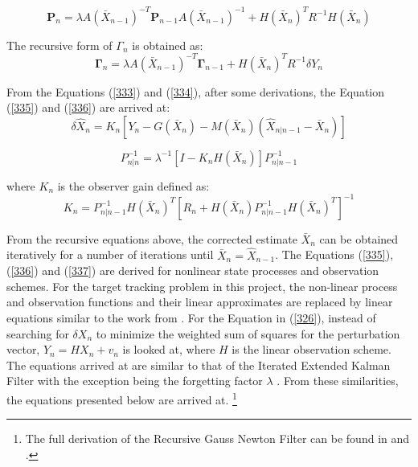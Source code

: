 \begin{equation}
    \mathbf{P}_n = \lambda A(\bar{X}_{n-1})^{-T}\mathbf{P}_{n-1}A(\bar{X}_{n-1})^{-1} + H(\bar{X}_n)^T R^{-1}H(\bar{X}_n)
    \label{333}
\end{equation}

The recursive form of \(\Gamma_n\) is obtained as: 
\begin{equation}
    \mathbf{\Gamma}_n = \lambda A(\bar{X}_{n-1})^{-T}\mathbf{\Gamma}_{n-1} + H(\bar{X}_n)^T R^{-1}\delta Y_n
    \label{334}
\end{equation}

From the Equations (\ref{333}) and (\ref{334}), after some derivations, the Equation (\ref{335}) and (\ref{336}) are arrived at:
\begin{equation}
    \delta \hat{X}_n = K_n[Y_n - G(\bar{X}_n) - M(\bar{X}_n)(\hat{X}_{n|n-1} - \bar{X}_n)]
    \label{335}
\end{equation}
 
\begin{equation}
    P^{-1}_{n|n} = \lambda^{-1}[I - K_n H(\bar{X}_n)]P^{-1}_{n|n-1}
    \label{336}
\end{equation}

where \(K_n\) is the observer gain defined as:
\begin{equation}
    K_n = P^{-1}_{n|n-1} H(\bar{X}_n)^T [R_n + H(\bar{X}_n) P^{-1}_{n|n-1} H(\bar{X}_n)^T]^{-1}
    \label{337}
\end{equation}

From the recursive equations above, the corrected estimate \(\bar{X}_n\) can be obtained iteratively for a number of iterations until \(\bar{X}_n = \hat{X}_{n-1}\). The Equations (\ref{335}), (\ref{336}) and (\ref{337}) are derived for nonlinear state processes and observation schemes. 
\newline
\newline
For the target tracking problem in this project, the non-linear process and observation functions and their linear approximates are replaced by linear equations similar to the work from \cite{Boyer2012}. For the Equation in (\ref{326}), instead of searching for \(\delta X_n\) to minimize the weighted sum of squares for the perturbation vector, \(Y_n = H X_n + v_n\) is looked at, where \(H\) is the linear observation scheme. The equations arrived at are similar to that of the Iterated Extended Kalman Filter with the exception being the forgetting factor \(\lambda\) \cite{De2015}. From these similarities, the equations presented below are arrived at.
\footnote{The full derivation of the Recursive Gauss Newton Filter can be found in \cite{De2015} and \cite{Inggs1}.}
